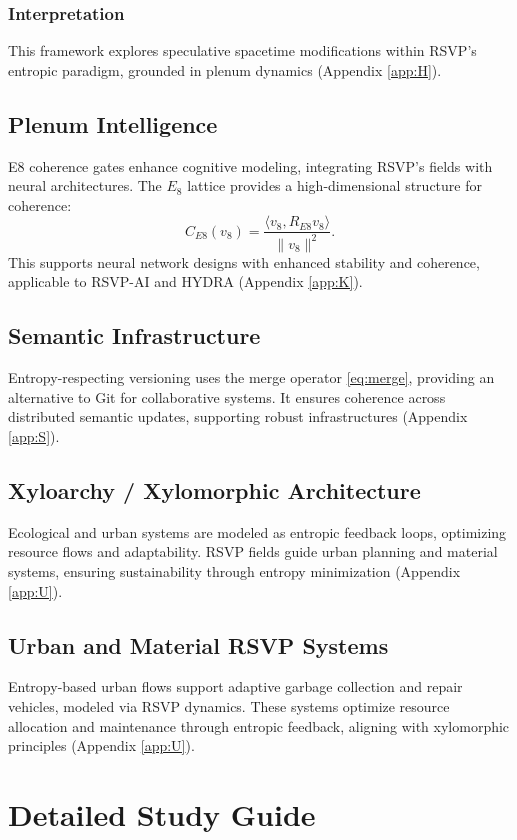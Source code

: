 \documentclass[12pt]{report}
\begin{document}
\section{Interpretation}
This framework explores speculative spacetime modifications within RSVP’s entropic paradigm, grounded in plenum dynamics (Appendix \ref{app:H}).

\chapter{Plenum Intelligence}
\label{app:CC}
E8 coherence gates enhance cognitive modeling, integrating RSVP’s fields with neural architectures. The \(E_8\) lattice provides a high-dimensional structure for coherence:
\[
C_{E8}(v_8) = \frac{\langle v_8, R_{E8} v_8 \rangle}{\|v_8\|^2}.
\]
This supports neural network designs with enhanced stability and coherence, applicable to RSVP-AI and HYDRA (Appendix \ref{app:K}).

\chapter{Semantic Infrastructure}
\label{app:DD}
Entropy-respecting versioning uses the merge operator \eqref{eq:merge}, providing an alternative to Git for collaborative systems. It ensures coherence across distributed semantic updates, supporting robust infrastructures (Appendix \ref{app:S}).

\chapter{Xyloarchy / Xylomorphic Architecture}
\label{app:EE}
Ecological and urban systems are modeled as entropic feedback loops, optimizing resource flows and adaptability. RSVP fields guide urban planning and material systems, ensuring sustainability through entropy minimization (Appendix \ref{app:U}).

\chapter{Urban and Material RSVP Systems}
\label{app:FF}
Entropy-based urban flows support adaptive garbage collection and repair vehicles, modeled via RSVP dynamics. These systems optimize resource allocation and maintenance through entropic feedback, aligning with xylomorphic principles (Appendix \ref{app:U}).

\part{Detailed Study Guide}
\end{document}
